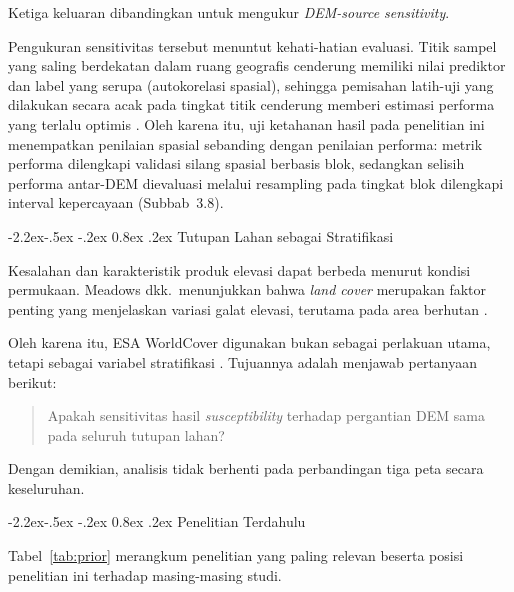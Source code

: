 \documentclass[12pt,a4paper]{article}
\makeatletter
\renewcommand\subsection{\@startsection{subsection}{2}{\z@}%
  {-2.2ex\@plus -.5ex \@minus -.2ex}%
  {0.8ex \@plus .2ex}%
  {\normalfont\normalsize\bfseries}}
\makeatother
\begin{document}
Ketiga keluaran dibandingkan untuk mengukur
\textit{DEM-source sensitivity}.

Pengukuran sensitivitas tersebut menuntut kehati-hatian evaluasi. Titik
sampel yang saling berdekatan dalam ruang geografis cenderung memiliki
nilai prediktor dan label yang serupa (autokorelasi spasial), sehingga
pemisahan latih-uji yang dilakukan secara acak pada tingkat titik
cenderung memberi estimasi performa yang terlalu optimis
\citep{roberts2017,ploton2020}. Oleh karena itu, uji ketahanan hasil pada
penelitian ini menempatkan penilaian spasial sebanding dengan penilaian
performa: metrik performa dilengkapi validasi silang spasial berbasis blok,
sedangkan selisih performa antar-DEM dievaluasi melalui resampling pada
tingkat blok dilengkapi interval kepercayaan (Subbab~3.8).

\subsection{Tutupan Lahan sebagai Stratifikasi}

Kesalahan dan karakteristik produk elevasi dapat berbeda menurut kondisi
permukaan. Meadows dkk.\ menunjukkan bahwa \textit{land cover} merupakan
faktor penting yang menjelaskan variasi galat elevasi, terutama pada area
berhutan \citep{meadows2024}.

Oleh karena itu, ESA WorldCover digunakan bukan sebagai perlakuan utama,
tetapi sebagai variabel stratifikasi \citep{zanaga2021}. Tujuannya
adalah menjawab pertanyaan berikut:

\begin{quote}
Apakah sensitivitas hasil \textit{susceptibility} terhadap pergantian DEM
sama pada seluruh tutupan lahan?
\end{quote}

Dengan demikian, analisis tidak berhenti pada perbandingan tiga peta secara
keseluruhan.

\subsection{Penelitian Terdahulu}

Tabel~\ref{tab:prior} merangkum penelitian yang paling relevan beserta
posisi penelitian ini terhadap masing-masing studi.
\end{document}
